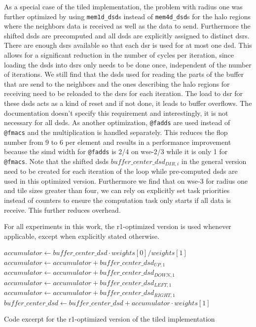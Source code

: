 As a special case of the tiled implementation, the problem with radius one was further optimized by using \texttt{mem1d\_dsd}s instead of \texttt{mem4d\_dsd}s for the halo regions where the neighbors data is received as well as the data to send. Furthermore the shifted \acp{dsd} are precomputed and all \acp{dsd} are explicitly assigned to distinct \acp{dsr}. There are enough \acp{dsr} available so that each \ac{dsr} is used for at most one \ac{dsd}. This allows for a significant reduction in the number of cycles per iteration, since loading the \acp{dsd} into \acp{dsr} only needs to be done once, independent of the number of iterations. We still find that the \acp{dsd} used for reading the parts of the buffer that are send to the neighbors and the ones describing the halo regions for receiving need to be reloaded to the \acp{dsr} for each iteration. The load to \ac{dsr} for these \acp{dsd} acts as a kind of reset and if not done, it leads to buffer overflows. The documentation doesn't specify this requirement and interestingly, it is not necessary for all \acp{dsd}. 
As another optimization, \texttt{@fadds} are used instead of \texttt{@fmacs} and the multiplication is handled separately. This reduces the flop number from $9$ to $6$ per element and results in a performance improvement because the simd width for \texttt{@fadds} is 2/4 on wse-2/3 while it is only 1 for \texttt{@fmacs}. Note that the shifted \acp{dsd} $buffer\_center\_dsd_{DIR,i}$ in the general version need to be created for each iteration of the loop while pre-computed \acp{dsd} are used in this optimized version.
Furthermore we find that on \ac{wse}-3 for radius one and tile sizes greater than four, we can rely on explicitly set task priorities instead of counters to ensure the computation task only starts if all data is receive. This further reduces overhead. 

For all experiments in this work, the r1-optimized version is used whenever applicable, except when explicitly stated otherwise.

\begin{algorithm}[tbh]
    \SetAlgoLined
    $accumulator \gets buffer\_center\_dsd \cdot weights[0]/weights[1]$\;
    $accumulator \gets accumulator + buffer\_center\_dsd_{UP,1}$\;
    $accumulator \gets accumulator + buffer\_center\_dsd_{DOWN,1}$\;
    $accumulator \gets accumulator + buffer\_center\_dsd_{LEFT,1}$\;
    $accumulator \gets accumulator + buffer\_center\_dsd_{RIGHT,1}$\;
    $buffer\_center\_dsd \gets buffer\_center\_dsd + accumulator \cdot weights[1]$\;
    \caption{Code excerpt for the r1-optimized version of the tiled implementation}\label{alg:r1_tiled_algorithm}
\end{algorithm}

